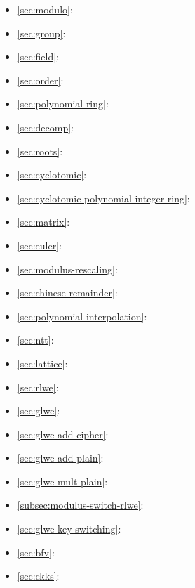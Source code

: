 \begin{tcolorbox}
\begin{itemize}
\item \autoref{sec:modulo}: 
\item \autoref{sec:group}: 
\item \autoref{sec:field}: 
\item \autoref{sec:order}: 
\item \autoref{sec:polynomial-ring}: 
\item \autoref{sec:decomp}: 
\item \autoref{sec:roots}: 
\item \autoref{sec:cyclotomic}: 
\item \autoref{sec:cyclotomic-polynomial-integer-ring}: 
\item \autoref{sec:matrix}: 
\item \autoref{sec:euler}: 
\item \autoref{sec:modulus-rescaling}: 
\item \autoref{sec:chinese-remainder}: 
\item \autoref{sec:polynomial-interpolation}: 
\item \autoref{sec:ntt}: 
\item \autoref{sec:lattice}: 
\item \autoref{sec:rlwe}: 
\item \autoref{sec:glwe}: 
\item \autoref{sec:glwe-add-cipher}: 
\item \autoref{sec:glwe-add-plain}: 
\item \autoref{sec:glwe-mult-plain}: 
\item \autoref{subsec:modulus-switch-rlwe}: 
\item \autoref{sec:glwe-key-switching}: 
\item \autoref{sec:bfv}: 
\item \autoref{sec:ckks}: 
\end{itemize}
\end{tcolorbox}

